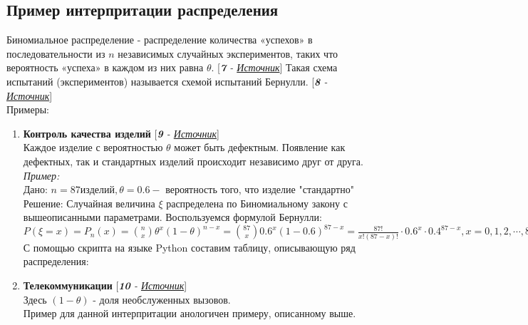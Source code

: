 \documentclass[14pt,a4paper,oneside]{extbook}
\begin{document}
	\subsection{Пример интерпритации распределения}
    Биномиальное распределение - распределение количества «успехов» в последовательности из $n$ независимых случайных экспериментов, таких что вероятность «успеха» в каждом из них равна $\theta$. [\textit{\textbf{7} - \href{https://ru.wikipedia.org/wiki/Биномиальное_распределение}{Источник}}] Такая схема испытаний (экспериментов) называется схемой испытаний Бернулли. [\textit{\textbf{8} - \href{https://ru.wikipedia.org/wiki/Схема_Бернулли}{Источник}}]\\ 
    Примеры:
    \begin{enumerate}
        \item \textbf{Контроль качества изделий} [\textit{\textbf{9} - \href{https://studopedia.ru/5_19612_primenenie-binomialnogo-raspredeleniya.html}{Источник}}] \\
        Каждое изделие с вероятностью $\theta$ может быть дефектным. Появление как дефектных, так и стандартных изделий происходит независимо друг от друга. \\
        \textit{Пример:} \\
        Дано: $n = 87 изделий, \theta = 0.6 - $ вероятность того, что изделие "стандартно" \\
        Решение: Случайная величина $\xi$ распределена по Биномиальному закону с вышеописанными параметрами. Воспользуемся формулой Бернулли: \\
        $\displaystyle P(\xi = x) = P_{n}(x) = \binom{n}{x}\theta^{x}(1-\theta)^{n - x} = \binom{87}{x}0.6^{x}(1-0.6)^{87 - x} = \frac{87!}{x!(87 - x)!} \cdot 0.6^{x} \cdot 0.4^{87 - x}, x = 0, 1, 2, \cdots, 87$ \\
        С помощью скрипта на языке Python составим таблицу, описывающую ряд распределения: \\
        \begin{figure}[h]
        \centering
        \caption{}
        \label{fig:my_label}
    \end{figure}
        \newpage
        \item \textbf{Телекоммуникации} [\textit{\textbf{10} - \href{http://statistica.ru/theory/binomialnoe-raspredelenie/}{Источник}}] \\
        Здесь $(1 - \theta)$ - доля необслуженных вызовов. \\
        Пример для данной интерпритации анологичен примеру, описанному выше.
    \end{enumerate}
\end{document}
